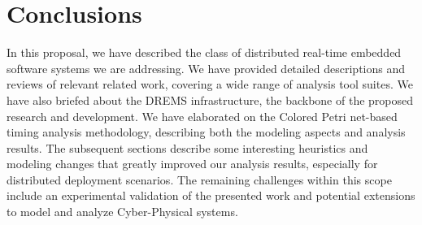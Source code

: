 \chapter{Conclusions}

In this proposal, we have described the class of distributed real-time embedded software systems we are addressing. We have provided detailed descriptions and reviews of relevant related work, covering a wide range of analysis tool suites. We have also briefed about the DREMS infrastructure, the backbone of the proposed research and development. We have elaborated on the Colored Petri net-based timing analysis methodology, describing both the modeling aspects and analysis results. The subsequent sections describe some interesting  heuristics and modeling changes that greatly improved our analysis results, especially for distributed deployment scenarios. The remaining challenges within this scope include an experimental validation of the presented work and potential extensions to model and analyze Cyber-Physical systems. 